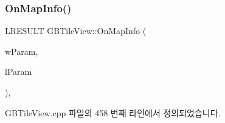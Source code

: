 \subsubsection{\texorpdfstring{On\+Map\+Info()}{OnMapInfo()}}
{\footnotesize\ttfamily L\+R\+E\+S\+U\+LT G\+B\+Tile\+View\+::\+On\+Map\+Info (\begin{DoxyParamCaption}\item[{W\+P\+A\+R\+AM}]{w\+Param,  }\item[{L\+P\+A\+R\+AM}]{l\+Param }\end{DoxyParamCaption})\hspace{0.3cm}{\ttfamily [protected]}, {\ttfamily [virtual]}}



G\+B\+Tile\+View.\+cpp 파일의 458 번째 라인에서 정의되었습니다.


